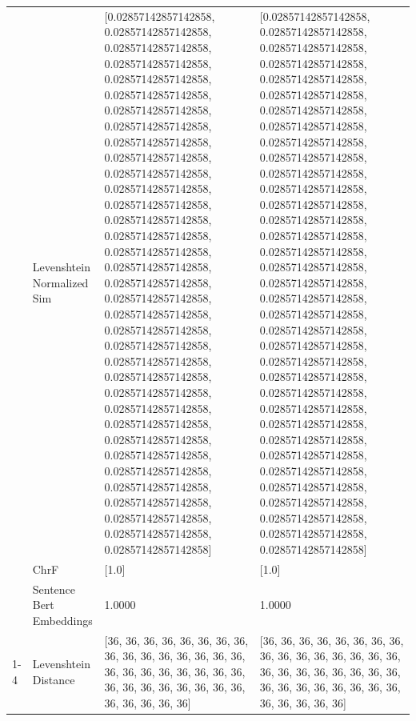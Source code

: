 \begin{tabular}{llll}
 & Levenshtein Normalized Sim & [0.02857142857142858, 0.02857142857142858, 0.02857142857142858, 0.02857142857142858, 0.02857142857142858, 0.02857142857142858, 0.02857142857142858, 0.02857142857142858, 0.02857142857142858, 0.02857142857142858, 0.02857142857142858, 0.02857142857142858, 0.02857142857142858, 0.02857142857142858, 0.02857142857142858, 0.02857142857142858, 0.02857142857142858, 0.02857142857142858, 0.02857142857142858, 0.02857142857142858, 0.02857142857142858, 0.02857142857142858, 0.02857142857142858, 0.02857142857142858, 0.02857142857142858, 0.02857142857142858, 0.02857142857142858, 0.02857142857142858, 0.02857142857142858, 0.02857142857142858, 0.02857142857142858, 0.02857142857142858, 0.02857142857142858, 0.02857142857142858, 0.02857142857142858] & [0.02857142857142858, 0.02857142857142858, 0.02857142857142858, 0.02857142857142858, 0.02857142857142858, 0.02857142857142858, 0.02857142857142858, 0.02857142857142858, 0.02857142857142858, 0.02857142857142858, 0.02857142857142858, 0.02857142857142858, 0.02857142857142858, 0.02857142857142858, 0.02857142857142858, 0.02857142857142858, 0.02857142857142858, 0.02857142857142858, 0.02857142857142858, 0.02857142857142858, 0.02857142857142858, 0.02857142857142858, 0.02857142857142858, 0.02857142857142858, 0.02857142857142858, 0.02857142857142858, 0.02857142857142858, 0.02857142857142858, 0.02857142857142858, 0.02857142857142858, 0.02857142857142858, 0.02857142857142858, 0.02857142857142858, 0.02857142857142858, 0.02857142857142858] \\
 & ChrF & [1.0] & [1.0] \\
 & Sentence Bert Embeddings & 1.0000 & 1.0000 \\
\cline{1-4}
\multirow[t]{4}{*}{Obomonto tiri ogotwara ebinto ebisani.} & Levenshtein Distance & [36, 36, 36, 36, 36, 36, 36, 36, 36, 36, 36, 36, 36, 36, 36, 36, 36, 36, 36, 36, 36, 36, 36, 36, 36, 36, 36, 36, 36, 36, 36, 36, 36, 36, 36, 36, 36] & [36, 36, 36, 36, 36, 36, 36, 36, 36, 36, 36, 36, 36, 36, 36, 36, 36, 36, 36, 36, 36, 36, 36, 36, 36, 36, 36, 36, 36, 36, 36, 36, 36, 36, 36, 36, 36] \\

\end{tabular}
